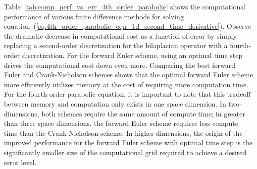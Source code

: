 \documentclass[oneeqnum,onefignum,onetabnum,onethmnum]{siamltex}
\begin{document}
Table~\ref{tab:comp_perf_vs_err_4th_order_parabolic} shows the computational 
performance of various finite difference methods for solving 
equation~(\ref{eq:4th_order_parabolic_eqn_1d_second_time_derivative}).
Observe the dramatic decrease in computational cost as a function of 
error by simply replacing a second-order discretization for the bilaplacian 
operator with a fourth-order discretization.  For the forward Euler scheme,
using an optimal time step drives the computational cost down even more.
Comparing the best forward Euler and Crank-Nicholson schemes shows that
the optimal forward Euler scheme more efficiently utilizes memory at the
cost of requiring more computation time.  For the fourth-order parabolic 
equation, it is important to note that this tradeoff between memory and 
computation only exists in one space dimension.  In two-dimensions, both 
schemes require the same amount of compute time; in greater than three space 
dimensions, the forward Euler scheme requires less compute time than the
Crank-Nicholson scheme.  In higher dimensions, the origin of the improved 
performance for the forward Euler scheme with optimal time step is the 
significantly smaller size of the computational grid required to achieve a 
desired error level.
\end{document}
